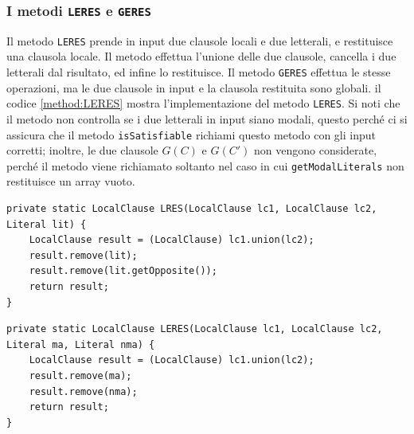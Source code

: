 \documentclass[a4paper,12pt]{report}
\begin{document}
\subsubsection{I metodi \texttt{LERES} e \texttt{GERES}}
Il metodo \texttt{LERES} prende in input due clausole locali e due letterali, e restituisce una clausola locale. Il metodo effettua l'unione delle due clausole, cancella i due letterali dal risultato, ed infine lo restituisce. Il metodo \texttt{GERES} effettua le stesse operazioni, ma le due clausole in input e la clausola restituita sono globali. il codice \ref{method:LERES} mostra l'implementazione del metodo \texttt{LERES}. Si noti che il metodo non controlla se i due letterali in input siano modali, questo perché ci si assicura che il metodo \texttt{isSatisfiable} richiami questo metodo con gli input corretti; inoltre, le due clausole $G(C)$ e $G(C')$ non vengono considerate, perché il metodo viene richiamato soltanto nel caso in cui \texttt{getModalLiterals} non restituisce un array vuoto.

\vspace{20pt}

\begin{minipage}{\linewidth}
    \begin{lstlisting}[caption={Metodo \texttt{LRES} della classe \texttt{Resolution}}, label={method:LRES}]
private static LocalClause LRES(LocalClause lc1, LocalClause lc2, Literal lit) {
    LocalClause result = (LocalClause) lc1.union(lc2);
    result.remove(lit);
    result.remove(lit.getOpposite());
    return result;
}
    \end{lstlisting}
\end{minipage}

\vspace{1cm}

\begin{minipage}{\linewidth}
    \begin{lstlisting}[caption={Metodo \texttt{LERES} della classe \texttt{Resolution}}, label={method:LERES}]
private static LocalClause LERES(LocalClause lc1, LocalClause lc2, Literal ma, Literal nma) {
    LocalClause result = (LocalClause) lc1.union(lc2);
    result.remove(ma);
    result.remove(nma);
    return result;
}
    \end{lstlisting}
\end{minipage}

\newpage
\end{document}

